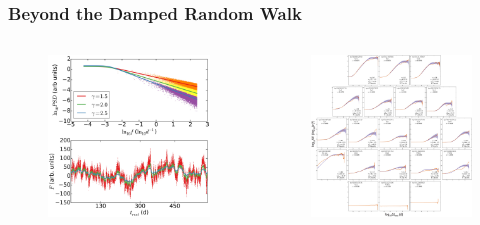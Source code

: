 \documentclass[hyperref={pdfpagelabels=false}]{beamer}
\begin{document}
\begin{frame}
\frametitle{Beyond the Damped Random Walk}
  \begin{columns}
    \centering
    \begin{column}{0.5\textwidth}
    \centering
      \begin{figure}
        \includegraphics[scale=0.09]{images/DRW.jpg}
      \end{figure}
    \end{column}
    \begin{column}{0.5\textwidth}
    \centering
      \begin{figure}
        \includegraphics[scale=0.4]{images/AllSF.jpg}

\end{figure}
\end{column}
\end{columns}
\end{frame}
\end{document}
